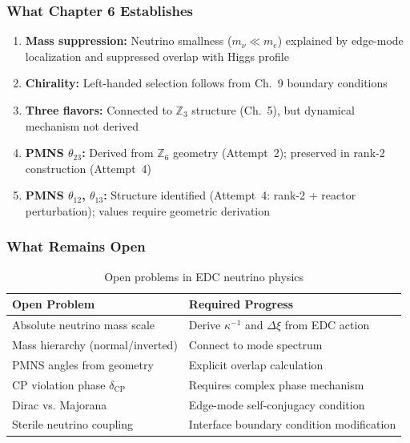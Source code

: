 \subsubsection{What Chapter 6 Establishes}

\begin{tcolorbox}[colback=green!5, colframe=green!50!black,
    title=\textbf{Chapter 6 Summary}]
\begin{enumerate}[nosep]
    \item \textbf{Mass suppression:} Neutrino smallness ($m_\nu \ll m_e$)
          explained by edge-mode localization and suppressed overlap with
          Higgs profile \tagDc{}
    \item \textbf{Chirality:} Left-handed selection follows from Ch.~9
          boundary conditions \tagDc{}
    \item \textbf{Three flavors:} Connected to $\mathbb{Z}_3$ structure
          (Ch.~5), but dynamical mechanism not derived \tagI{}
    \item \textbf{PMNS $\theta_{23}$:} Derived from $\mathbb{Z}_6$ geometry
          (Attempt~2); preserved in rank-2 construction (Attempt~4) \tagDc{}
    \item \textbf{PMNS $\theta_{12}$, $\theta_{13}$:} Structure identified
          (Attempt~4: rank-2 + reactor perturbation); values require geometric derivation \tagI{}
\end{enumerate}
\end{tcolorbox}

\subsubsection{What Remains Open}

\begin{table}[ht]
\centering
\caption{Open problems in EDC neutrino physics}
\label{tab:ch6_open}
\begin{tabular}{p{5.5cm}p{5.5cm}}
\toprule
\textbf{Open Problem} & \textbf{Required Progress} \\
\midrule
Absolute neutrino mass scale & Derive $\kappa^{-1}$ and $\Delta\xi$ from EDC action \\
Mass hierarchy (normal/inverted) & Connect to mode spectrum \\
PMNS angles from geometry & Explicit overlap calculation \\
CP violation phase $\delta_{\text{CP}}$ & Requires complex phase mechanism \\
Dirac vs. Majorana & Edge-mode self-conjugacy condition \\
Sterile neutrino coupling & Interface boundary condition modification \\
\bottomrule
\end{tabular}
\end{table}

